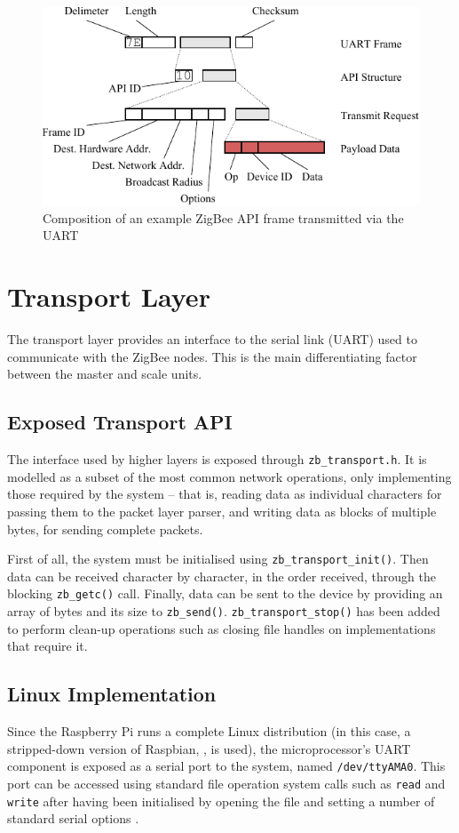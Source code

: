 \begin{figure}
\includegraphics[width=\textwidth]{images/packets.pdf}
\caption{Composition of an example ZigBee API frame transmitted via the UART}
\label{packets-example}
\end{figure}

\section{Transport Layer}
The transport layer provides an interface to the serial link (UART) used to communicate with the ZigBee nodes. This is the main differentiating factor between the master and scale units.

\subsection{Exposed Transport API}
The interface used by higher layers is exposed through \texttt{zb\_transport.h}. It is modelled as a subset of the most common network operations, only implementing those required by the system -- that is, reading data as individual characters for passing them to the packet layer parser, and writing data as blocks of multiple bytes, for sending complete packets.

First of all, the system must be initialised using \texttt{zb\_transport\_init()}. Then data can be received character by character, in the order received, through the blocking \texttt{zb\_getc()} call. Finally, data can be sent to the device by providing an array of bytes and its size to \texttt{zb\_send()}. \texttt{zb\_transport\_stop()} has been added to perform clean-up operations such as closing file handles on implementations that require it.

\subsection{Linux Implementation}
Since the Raspberry Pi runs a complete Linux distribution (in this case, a stripped-down version of Raspbian, \cite{raspbian}, is used), the microprocessor's UART component is exposed as a serial port to the system, named \texttt{/dev/ttyAMA0}. This port can be accessed using standard file operation system calls such as \texttt{read} and \texttt{write} after having been initialised by opening the file and setting a number of standard serial options \cite{posix-serial-programming}.

